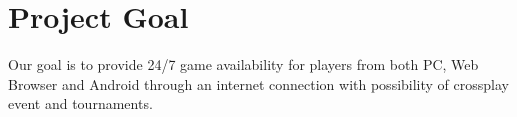 \section{Project Goal}

Our goal is to provide 24/7 game availability for players from both PC, Web Browser and Android through an internet connection with possibility of crossplay event and tournaments.